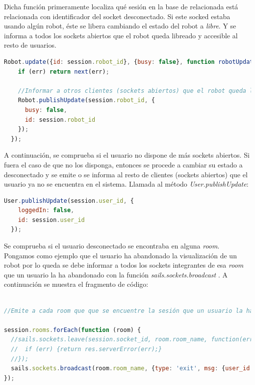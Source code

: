 Dicha función primeramente localiza qué sesión en la base de relacionada está relacionada con identificador del socket desconectado. Si este socked estaba usando algún robot, éste se libera cambiando el estado
del robot a \emph{libre}. Y se informa a todos los sockets abiertos que el robot queda libreado y accesible al resto de usuarios.\\

\begin{lstlisting}[language=JavaScript]
  Robot.update({id: session.robot_id}, {busy: false}, function robotUpdated(err) {
    if (err) return next(err);

    //Informar a otros clientes (sockets abiertos) que el robot queda liberado
    Robot.publishUpdate(session.robot_id, {
      busy: false,
      id: session.robot_id
    });
  });
\end{lstlisting}


A continuación, se comprueba si el usuario no dispone de más sockets abiertos. Si fuera el caso de que no los disponga, entonces se procede a cambiar su estado a desconectado y se emite o se informa al resto de clientes (sockets abiertos)
que el usuario ya no se encuentra en el sistema. Llamada al método \emph{User.publishUpdate}: \\

\begin{lstlisting}[language=JavaScript]
   User.publishUpdate(session.user_id, {
    loggedIn: false,
    id: session.user_id
  });
\end{lstlisting}


Se comprueba si el usuario desconectado se encontraba en alguna \emph{room}. Pongamos como ejemplo que el usuario ha abandonado la visualización de un robot por lo queda
se debe informar a todos los sockets integrantes de esa \emph{room} que un usuario la ha abandonado con la función \emph{ sails.sockets.broadcast }. A continuación se muestra el fragmento de código:\\


\begin{lstlisting}[language=JavaScript]

//Emite a cada room que que se encuentre la sesión que un usuario la ha abandonado

session.rooms.forEach(function (room) {
  //sails.sockets.leave(session.socket_id, room.room_name, function(err) {
  //  if (err) {return res.serverError(err);}
  //});
  sails.sockets.broadcast(room.room_name, {type: 'exit', msg: {user_id: session.user_id}});
});

\end{lstlisting}



